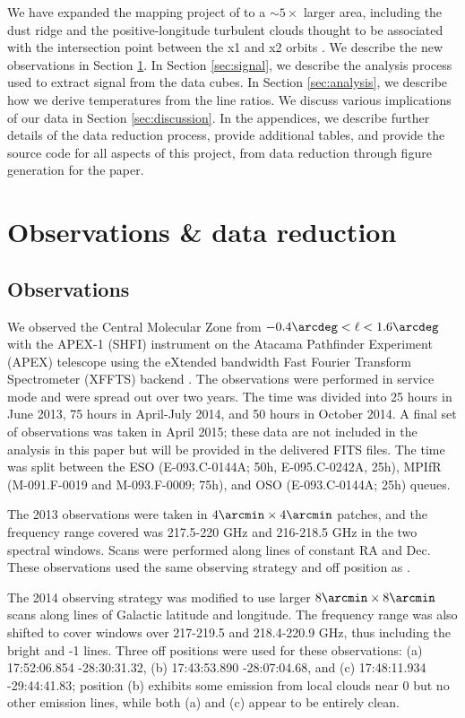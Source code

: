 We have expanded the \formaldehyde mapping project of \citet{Ao2013a} to a
$\sim5\times$ larger area, including the dust ridge and the positive-longitude
turbulent clouds thought to be associated with the intersection point between
the x1 and x2 orbits \citep{Rodriguez-Fernandez2006b,Riquelme2013a}.  We
describe the new
observations in Section \ref{sec:observations}.  In Section \ref{sec:signal},
we describe the analysis process used to extract signal from the data cubes.
In Section \ref{sec:analysis}, we describe how we 
derive temperatures from the line ratios.
We discuss various implications of our data in Section
\ref{sec:discussion}.  In the appendices, we describe further details of the
data reduction process, provide additional tables, and provide the source code
for all aspects of this project, from data reduction through figure generation
for the paper.


\section{Observations \& data reduction}
\label{sec:observations}

\subsection{Observations}
We observed the Central Molecular Zone from $-0.4\arcdeg < \ell < 1.6\arcdeg$
with the APEX-1 (SHFI) instrument \citep{Vassilev2008a} on the Atacama Pathfinder
Experiment (APEX) telescope \citep{Gusten2006b} using the eXtended bandwidth
Fast Fourier Transform
Spectrometer (XFFTS) backend \citep{Klein2012a}.  The observations were
performed in service mode and were spread out over two years.  The time was
divided into 25 hours in June
2013, 75 hours in April-July 2014, and 50 hours in October 2014.  A final
set of observations was taken in April 2015; these data are not included in the
analysis in this paper but will be provided in the delivered FITS files.  The
time was split between the ESO (E-093.C-0144A; 50h, E-095.C-0242A, 25h), MPIfR
(M-091.F-0019 and M-093.F-0009; 75h), and OSO (E-093.C-0144A; 25h) queues.

The 2013 observations were taken in $4\arcmin \times 4\arcmin$ patches, and the
frequency range covered was 217.5-220 GHz and 216-218.5 GHz in the two spectral
windows. Scans were performed along lines of constant RA and Dec.  These
observations used the same observing strategy and off position as
\citet{Ao2013a}.

The 2014 observing strategy was modified to use larger $8\arcmin \times
8\arcmin$ scans along lines of Galactic latitude and longitude.  The frequency
range was also shifted to cover windows over 217-219.5 and 218.4-220.9 GHz, thus
including the bright \thirteenco and -1 lines.
Three off positions were used for these observations: (a) 17:52:06.854
-28:30:31.32, (b) 17:43:53.890 -28:07:04.68, and (c) 17:48:11.934 -29:44:41.83;
position (b) exhibits some \thirteenco emission from local clouds near 0 \kms
but no other emission lines, while both (a) and (c) appear to be entirely
clean.

